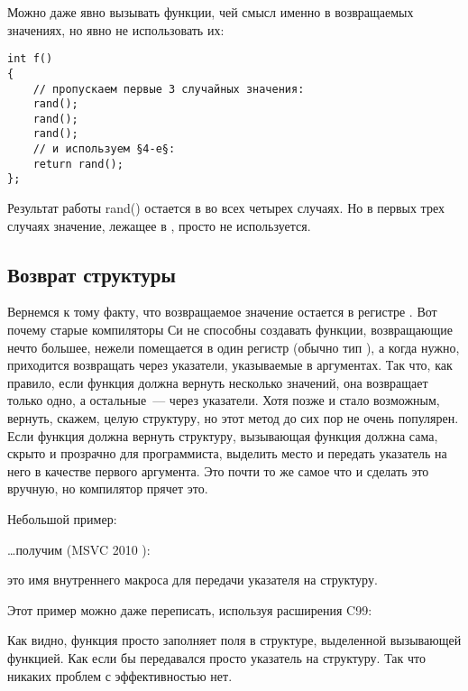Можно даже явно вызывать функции, чей смысл именно в возвращаемых значениях, но явно не использовать их:

\begin{lstlisting}[style=customc]
int f()
{
    // пропускаем первые 3 случайных значения:
    rand();
    rand();
    rand();
    // и используем §4-е§:
    return rand();
};
\end{lstlisting}

Результат работы rand() остается в \EAX во всех четырех случаях.
Но в первых трех случаях значение, лежащее в \EAX, просто не используется.

\subsection{Возврат структуры}

Вернемся к тому факту, что возвращаемое значение остается в регистре \EAX.
Вот почему старые компиляторы Си не способны создавать функции, возвращающие нечто большее, нежели 
помещается в один регистр (обычно тип \Tint), а когда нужно, приходится возвращать через указатели, указываемые 
в аргументах.
Так что, как правило, если функция должна вернуть несколько значений, она возвращает только одно, 
а остальные~--- через указатели.
Хотя позже и стало возможным, вернуть, скажем, целую структуру, но этот метод до сих пор не 
очень популярен. 
Если функция должна вернуть структуру, вызывающая функция должна сама, скрыто и прозрачно для программиста, 
выделить место и передать указатель на него в качестве первого аргумента. Это почти то же самое 
что и сделать это вручную, но компилятор прячет это.

Небольшой пример:



\dots получим (MSVC 2010 \Ox):



 это имя внутреннего макроса для передачи указателя на структуру.

Этот пример можно даже переписать, используя расширения C99:





Как видно, функция просто заполняет поля в структуре, выделенной вызывающей функцией. 
Как если бы передавался просто указатель на структуру.
Так что никаких проблем с эффективностью нет.

